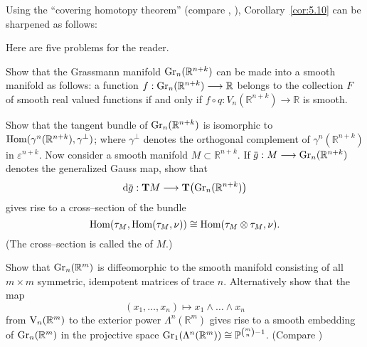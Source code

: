 \documentclass[../main]{subfiles}
\begin{document}
\begin{remark}
Using the ``covering homotopy theorem'' (compare \cite{dold1972}, \cite{husemoller}), Corollary~\ref{cor:5.10} can be sharpened as follows: 
\end{remark}

Here are five problems for the reader. 

\begin{problem}\label{prob-5-A}
Show that the Grassmann manifold $\operatorname{Gr}_n({\mathbb R}^{n + k})$ can be made into a smooth manifold as follows: a function $f : \operatorname{Gr}_n({\mathbb R}^{n + k}) \longrightarrow \mathbb R$ belongs to the collection $F$ of smooth real valued functions if and only if $f \circ q : V_n({\mathbb R}^{n + k}) \longrightarrow \mathbb R$ is smooth.
\end{problem}

\begin{problem}\label{prob-5-B}
Show that the tangent bundle of $\operatorname{Gr}_n({\mathbb R}^{n + k})$ is isomorphic to $\operatorname{Hom}(\gamma^n({\mathbb R}^{n + k}), \gamma^\bot)$; where $\gamma^\bot$ denotes the orthogonal complement of $\gamma^n({\mathbb R}^{n + k})$ in $\varepsilon^{n + k}$. Now consider a smooth manifold $M \subset {\mathbb R}^{n + k}$. If $\xoverline g : M \longrightarrow \grassmannian_n({\mathbb R}^{n + k})$ denotes the generalized Gauss map, show that \[\tangentbundlemap {\xoverline g} : \tangentTS M \longrightarrow \mathbf{T}\bigl( {\grassmannian_n({\mathbb R}^{n + k})}\bigr)\] gives rise to a cross--section of the bundle 
\[\operatorname{Hom}(\tau_{M}, \operatorname{Hom}(\tau_{M}, \nu)) \cong \operatorname{Hom}(\tau_{M} \otimes \tau_{M}, \nu).\] (The cross--section is called the  of $M$.) 
\end{problem}

\begin{problem}\label{prob-5-C}
Show that $\operatorname{Gr}_n({\mathbb R}^m)$ is diffeomorphic to the smooth manifold consisting of all $m \times m$ symmetric, idempotent matrices of trace $n$. Alternatively show that the map \[(x_1, \ldots, x_n) \mapsto x_1 \wedge \ldots \wedge x_n\] from $\operatorname{V}_n({\mathbb R}^m)$ to the exterior power $\Lambda^n({\mathbb R}^m)$ gives rise to a smooth embedding of $\operatorname{Gr}_n({\mathbb R}^m)$ in the projective space $\operatorname{Gr}_1(\Lambda^n({\mathbb R}^m)) \cong {\mathbb P}^{\binom m n - 1}$. (Compare \cite[\S7]{pedoe_1939})
\end{problem}
\end{document}
